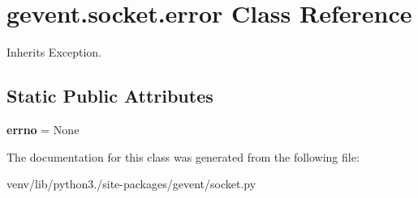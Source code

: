 \hypertarget{classgevent_1_1socket_1_1error}{}\section{gevent.\+socket.\+error Class Reference}
\label{classgevent_1_1socket_1_1error}


Inherits Exception.

\subsection*{Static Public Attributes}
\begin{DoxyCompactItemize}
\item 
\mbox{\label{classgevent_1_1socket_1_1error_aaa2e5eee0bc4e3a6d906a6d5775abf25}} 
{\bfseries errno} = None
\end{DoxyCompactItemize}


The documentation for this class was generated from the following file\+:\begin{DoxyCompactItemize}
\item 
venv/lib/python3./site-\/packages/gevent/socket.\+py\end{DoxyCompactItemize}
